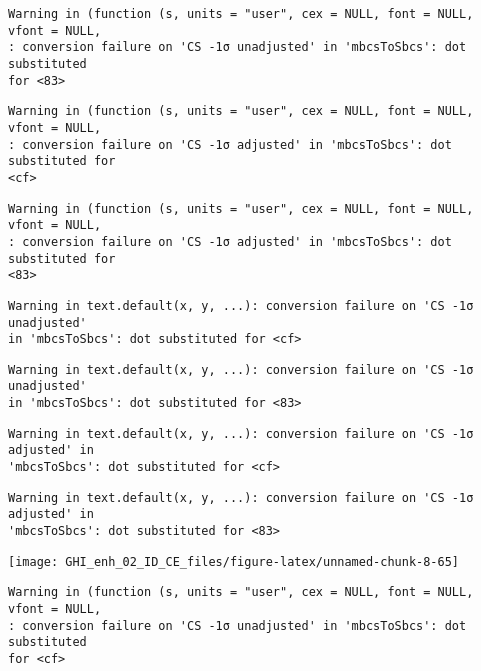 \documentclass[
  10pt,
  a4paper,oneside]{article}
\begin{document}
\begin{verbatim}
Warning in (function (s, units = "user", cex = NULL, font = NULL, vfont = NULL,
: conversion failure on 'CS -1σ unadjusted' in 'mbcsToSbcs': dot substituted
for <83>
\end{verbatim}

\begin{verbatim}
Warning in (function (s, units = "user", cex = NULL, font = NULL, vfont = NULL,
: conversion failure on 'CS -1σ adjusted' in 'mbcsToSbcs': dot substituted for
<cf>
\end{verbatim}

\begin{verbatim}
Warning in (function (s, units = "user", cex = NULL, font = NULL, vfont = NULL,
: conversion failure on 'CS -1σ adjusted' in 'mbcsToSbcs': dot substituted for
<83>
\end{verbatim}

\begin{verbatim}
Warning in text.default(x, y, ...): conversion failure on 'CS -1σ unadjusted'
in 'mbcsToSbcs': dot substituted for <cf>
\end{verbatim}

\begin{verbatim}
Warning in text.default(x, y, ...): conversion failure on 'CS -1σ unadjusted'
in 'mbcsToSbcs': dot substituted for <83>
\end{verbatim}

\begin{verbatim}
Warning in text.default(x, y, ...): conversion failure on 'CS -1σ adjusted' in
'mbcsToSbcs': dot substituted for <cf>
\end{verbatim}

\begin{verbatim}
Warning in text.default(x, y, ...): conversion failure on 'CS -1σ adjusted' in
'mbcsToSbcs': dot substituted for <83>
\end{verbatim}

\begin{center}\texttt{[image: GHI\_enh\_02\_ID\_CE\_files/figure-latex/unnamed-chunk-8-65]} \end{center}

\begin{verbatim}
Warning in (function (s, units = "user", cex = NULL, font = NULL, vfont = NULL,
: conversion failure on 'CS -1σ unadjusted' in 'mbcsToSbcs': dot substituted
for <cf>
\end{verbatim}
\end{document}
